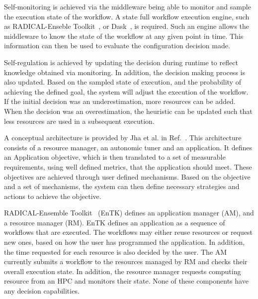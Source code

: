 Self-monitoring is achieved via the middleware being able to monitor and sample 
the execution state of the workflow. A state full workflow execution engine,
such as RADICAL-Enseble Toolkit~\cite{balasubramanian2018harnessing}, or 
Dask~\cite{rocklin2015dask}, is required. Such an engine allows the middleware 
to know the state of the workflow at any given point in time. This information 
can then be used to evaluate the configuration decision made.

Self-regulation is achieved by updating the decision during runtime to reflect 
knowledge obtained via monitoring. In addition, the decision making process is 
also updated. Based on the sampled state of execution, and the probability of 
achieving the defined goal, the system will adjust the execution of the 
workflow. If the initial decision was an underestimation, more resources can be 
added. When the decision was an overestimation, the heuristic can be updated 
such that less resources are used in a subsequent execution.


A conceptual architecture is provided by Jha et al. in Ref.~\cite{jha2009self}. 
This architecture consists of a resource manager, an autonomic tuner and an 
application. It defines an Application objective, which is then translated to a 
set of measurable requirements, using well defined metrics, that the 
application should meet. These objectives are achieved through user defined 
mechanisms. Based on the objective and a set of mechanisms, the system can then 
define necessary strategies and actions to achieve the objective.

RADICAL-Ensemble Toolkit~\cite{balasubramanian2018harnessing} (EnTK) defines an 
application manager (AM), and a resource manager (RM). EnTK defines an 
application as a sequence of workflows that are executed. The workflows may 
either reuse resources or request new ones, based on how the user has 
programmed the application. In addition, the time requested for each resource 
is also decided by the user. The AM currently submits a workflow to the 
resources managed by RM and checks their overall execution state. In addition, 
the resource manager requests computing resource from an HPC and monitors their 
state. None of these components have any decision capabilities.

